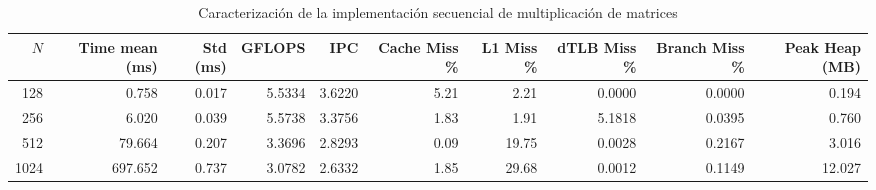 \begin{table}[h]
\centering
\caption{Caracterización de la implementación secuencial de multiplicación de matrices}
\label{tab:seq_profiling}
\begin{tabular}{rrrrrrrrrr}
\toprule
$N$ & Time mean (ms) & Std (ms) & GFLOPS & IPC & Cache Miss \% & L1 Miss \% & dTLB Miss \% & Branch Miss \% & Peak Heap (MB) \\
\midrule
128 & 0.758 & 0.017 & 5.5334 & 3.6220 & 5.21 & 2.21 & 0.0000 & 0.0000 & 0.194 \\
256 & 6.020 & 0.039 & 5.5738 & 3.3756 & 1.83 & 1.91 & 5.1818 & 0.0395 & 0.760 \\
512 & 79.664 & 0.207 & 3.3696 & 2.8293 & 0.09 & 19.75 & 0.0028 & 0.2167 & 3.016 \\
1024 & 697.652 & 0.737 & 3.0782 & 2.6332 & 1.85 & 29.68 & 0.0012 & 0.1149 & 12.027 \\
\bottomrule
\end{tabular}
\end{table}